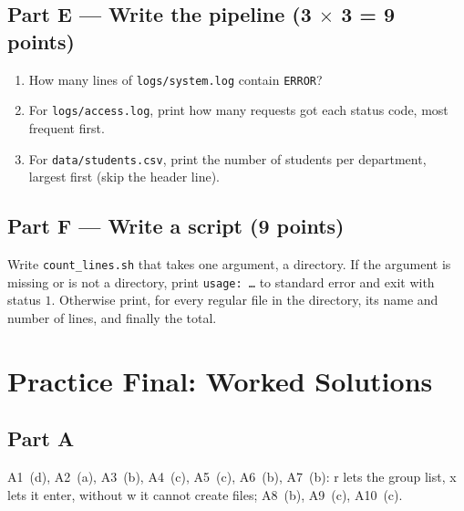 \documentclass[11pt,a4paper]{article}
\begin{document}
\subsection*{Part E --- Write the pipeline (3 $\times$ 3 = 9 points)}
\begin{enumerate}[leftmargin=1.6em,label=E\arabic*.]
  \item How many lines of \texttt{logs/system.log} contain \texttt{ERROR}?
  \item For \texttt{logs/access.log}, print how many requests got each status code, most frequent first.
  \item For \texttt{data/students.csv}, print the number of students per department, largest first (skip the header line).
\end{enumerate}

\subsection*{Part F --- Write a script (9 points)}
Write \texttt{count\_lines.sh} that takes one argument, a directory. If the argument is missing or is not a directory, print \texttt{usage: \dots} to standard error and exit with status $1$. Otherwise print, for every regular file in the directory, its name and number of lines, and finally the total.

\section{Practice Final: Worked Solutions}
\label{sec:pfsol}

\subsection*{Part A}
A1~(d), A2~(a), A3~(b), A4~(c), A5~(c), A6~(b), A7~(b): r lets the group list, x lets it enter, without w it cannot create files; A8~(b), A9~(c), A10~(c).
\end{document}
